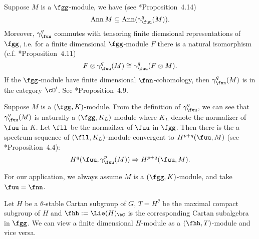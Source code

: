 \documentclass[12pt,a4paper]{amsart}
\DeclareMathOperator{\Ann}{Ann}
\numberwithin{equation}{section}
\theoremstyle{remark}
\begin{document}
Suppose $M$ is a $\fgg$-module, we have (see \cite{Cas}*{Proposition~4.14})
\begin{equation}\label{eq:anngamma}
  \Ann M \subseteq \Ann (\gamma_{\fuu}^{q}(M)).
\end{equation}
Moreover, $\gamma_{\fuu}^{q}$ commutes with tensoring finite diemsional
representations of $\fgg$, i.e. for a finite dimensional $\fgg$-module $F$ there
is a natural isomorphism (c.f. \cite{Cas}*{Proposition~4.11})
\begin{equation}\label{eq:Fgamma}
  F\otimes \gamma_{\fuu}^{q}(M)\cong
  \gamma_{\fuu}^{q}(F\otimes M).
\end{equation}
If the $\fgg$-module have finite dimensional $\fnn$-cohomology, then
$\gamma_{\fnn}^{q}(M)$ is in the category $\cO'$. See
\cite{Cas}*{Proposition~4.9}.



Suppose $M$ is a $(\fgg,K)$-module. From the definition of $\gamma_{\fuu}^{q}$,
we can see that $\gamma_{\fuu}^{q}(M)$ is naturally a $(\fgg, K_{L})$-module
where $K_{L}$ denote the normalizer of $\fuu$ in $K$. Let $\fll$ be the
normailzer of $\fuu$ in $\fgg$. Then there is the a spectrum sequence of
$(\fll,K_{L})$-module convergent to $H^{p+q}(\fuu,M)$ (see
\cite{Cas}*{Proposition~4.4}):
\begin{equation}\label{eq:ugamma}
  H^{q}(\fuu,\gamma_{\fuu}^{p}(M)) \Rightarrow H^{p+q}(\fuu,M).
\end{equation}

For our application, we always assume $M$ is a $(\fgg,K)$-module, and take
$\fuu=\fnn$.

Let $H$ be a $\theta$-stable Cartan subgroup of $G$, $T=H^{\theta}$ be the
maximal compact subgroup of $H$ and $\fhh:=\Lie(H)_{\bC}$ is the corresponding
Cartan subalgebra in $\fgg$. We can view a finite dimensional $H$-module as a
$(\fhh,T)$-module and vice versa.
\end{document}
